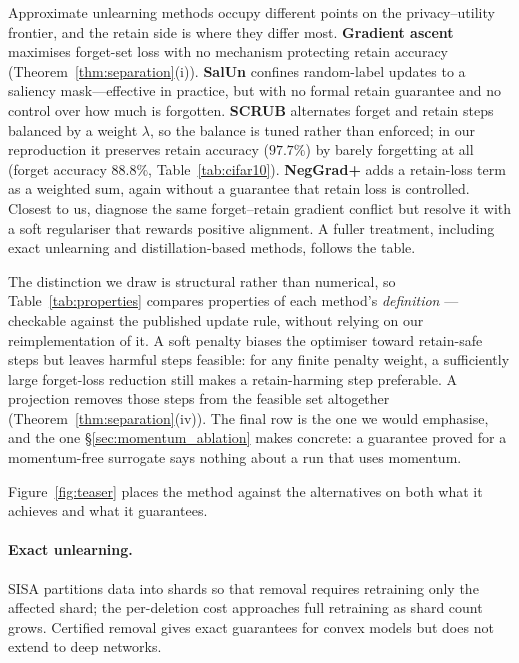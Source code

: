 \documentclass{article}
\newcommand{\rev}[1]{{\color{revisedB}#1}}
\theoremstyle{remark}
\theoremstyle{plain}
\begin{document}
Approximate unlearning methods occupy different points on the privacy--utility
frontier, and the retain side is where they differ most. \textbf{Gradient
ascent} \citep{thudi2022unrolling} maximises forget-set loss with no mechanism
protecting retain accuracy \rev{(Theorem~\ref{thm:separation}(i))}. \textbf{SalUn} \citep{fan2024salun} confines random-label updates to a
saliency mask---effective in practice, but with no formal retain guarantee and
no control over how much is forgotten. \textbf{SCRUB}
\citep{kurmanji2023unbounded} alternates forget and retain steps balanced by a
weight $\lambda$, so the balance is tuned rather than enforced; in our
reproduction it preserves retain accuracy ($97.7\%$) by barely forgetting at all
(forget accuracy $88.8\%$, Table~\ref{tab:cifar10}). \textbf{NegGrad+}
\citep{thudi2022unrolling} adds a retain-loss term as a weighted sum, again
without a guarantee that retain loss is controlled. Closest to us,
\citet{patel2025learning} diagnose the same forget--retain gradient conflict but
resolve it with a soft regulariser that rewards positive alignment. A fuller treatment, including exact unlearning and distillation-based methods, follows the table.

The distinction we draw is structural rather than numerical, so
Table~\ref{tab:properties} compares properties of each method's \emph{definition}
---checkable against the published update rule, without relying on our
reimplementation of it. A soft penalty biases the optimiser toward retain-safe
steps but leaves harmful steps feasible: for any finite penalty weight, a
sufficiently large forget-loss reduction still makes a retain-harming step
preferable. A projection removes those steps from the feasible set altogether
(Theorem~\ref{thm:separation}(iv)). The final row is the one we would emphasise,
and the one \S\ref{sec:momentum_ablation} makes concrete: a guarantee proved for
a momentum-free surrogate says nothing about a run that uses momentum.

\rev{Figure~\ref{fig:teaser}} places the method against the alternatives on both
what it achieves and what it guarantees.

\paragraph{Exact unlearning.}
SISA \citep{bourtoule2021sisa} partitions data into shards so that removal
requires retraining only the affected shard; the per-deletion cost approaches
full retraining as shard count grows. Certified removal
\citep{guo2020certified} gives exact guarantees for convex models but does not
extend to deep networks.
\end{document}
